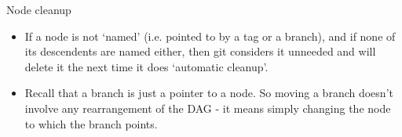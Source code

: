 \documentclass[usenames,dvipsnames]{beamer}
\begin{document}
\begin{frame}{Node cleanup}
  \begin{block}{}
    \begin{itemize}
      \item{If a node is not `named' (i.e. pointed to by a tag or a branch), and if none of its descendents are named either, then git considers it unneeded and will delete it the next time it does `automatic cleanup'.}
      \item{Recall that a branch is just a pointer to a node. So moving a branch doesn't involve any rearrangement of the DAG - it means simply changing the node to which the branch points.}
    \end{itemize}
  \end{block}
\end{frame}
\end{document}
